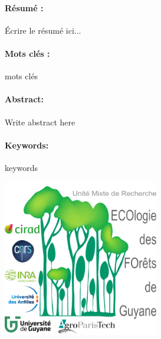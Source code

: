 \documentclass[12pt,]{article}
\theoremstyle{definition}
\theoremstyle{definition}
\theoremstyle{remark}
\begin{document}
  \paragraph{Résumé :}
  Écrire le résumé ici...
  \paragraph{Mots clés :} mots clés
  \newline\newline
  \paragraph{Abstract:}
  Write abstract here
  \paragraph{Keywords:} keywords
  
  \vspace*{\fill}
  \includegraphics{images/logo}
\end{document}
